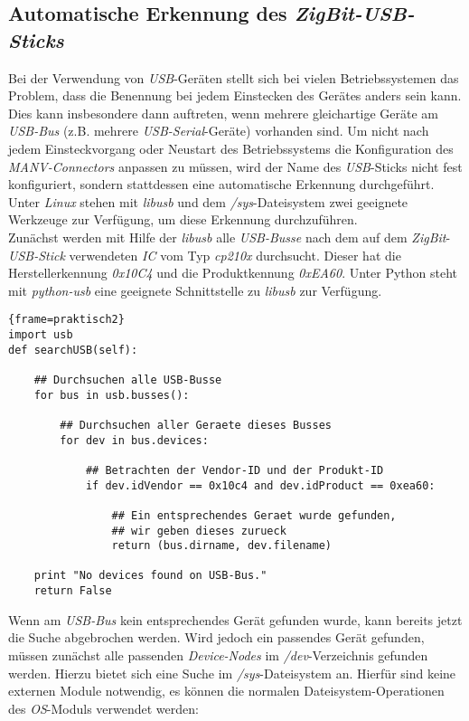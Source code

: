 \subsection{Automatische Erkennung des \emph{ZigBit-USB-Sticks}}\label{usb_stick_erkennen}
Bei der Verwendung von \emph{USB}-Geräten stellt sich bei vielen Betriebssystemen das Problem,
dass die Benennung bei jedem Einstecken des Gerätes anders sein kann. Dies kann insbesondere
dann auftreten, wenn mehrere gleichartige Geräte am \emph{USB-Bus} (z.B. mehrere 
\emph{USB-Serial}-Geräte) vorhanden sind. Um nicht nach jedem Einsteckvorgang oder Neustart des Betriebssystems die
Konfiguration des \emph{MANV-Connectors} anpassen zu müssen, wird der Name des \emph{USB}-Sticks
nicht fest konfiguriert, sondern stattdessen eine automatische Erkennung durchgeführt.
Unter \emph{Linux} stehen mit \emph{libusb} und dem \emph{/sys}-Dateisystem zwei geeignete Werkzeuge
zur Verfügung, um diese Erkennung durchzuführen.\\
Zunächst werden mit Hilfe der \emph{libusb} alle \emph{USB-Busse} nach dem auf dem \emph{ZigBit}-\emph{USB-Stick}
verwendeten \emph{IC} vom Typ \emph{cp210x} durchsucht. Dieser hat die Herstellerkennung \emph{0x10C4} und die
Produktkennung \emph{0xEA60}. Unter Python steht mit \emph{python-usb} eine geeignete Schnittstelle zu
\emph{libusb} zur Verfügung.

\begin{lstlisting}{frame=praktisch2}
import usb
def searchUSB(self):

    ## Durchsuchen alle USB-Busse 
    for bus in usb.busses():

        ## Durchsuchen aller Geraete dieses Busses
        for dev in bus.devices:

            ## Betrachten der Vendor-ID und der Produkt-ID
            if dev.idVendor == 0x10c4 and dev.idProduct == 0xea60:
               
                ## Ein entsprechendes Geraet wurde gefunden,
                ## wir geben dieses zurueck 
                return (bus.dirname, dev.filename)
   
    print "No devices found on USB-Bus."
    return False
\end{lstlisting}

Wenn am \emph{USB-Bus} kein entsprechendes Gerät gefunden wurde, kann bereits jetzt die Suche abgebrochen werden.
Wird jedoch ein passendes Gerät gefunden, müssen zunächst alle passenden \emph{Device-Nodes} im
\emph{/dev}-Verzeichnis gefunden werden. Hierzu bietet sich eine Suche im \emph{/sys}-Dateisystem an. Hierfür sind keine
externen Module notwendig, es können die normalen Dateisystem-Operationen des \emph{OS}-Moduls verwendet werden:

